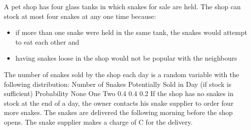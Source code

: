 \documentclass[a4paper,12pt]{article}
\begin{document}
A pet shop has four glass tanks in which snakes for sale are held. The shop can stock
at most four snakes at any one time because:
\begin{itemize}
    \item if more than one snake were held in the same tank, the snakes would attempt to
eat each other and
\item having snakes loose in the shop would not be popular with the neighbours
\end{itemize}

The number of snakes sold by the shop each day is a random variable with the
following distribution:
Number of Snakes Potentially Sold
in Day (if stock is sufficient) Probability
None
One
Two 0.4
0.4
0.2
If the shop has no snakes in stock at the end of a day, the owner contacts his snake
supplier to order four more snakes. The snakes are delivered the following morning
before the shop opens. The snake supplier makes a charge of C for the delivery.
\end{document}
